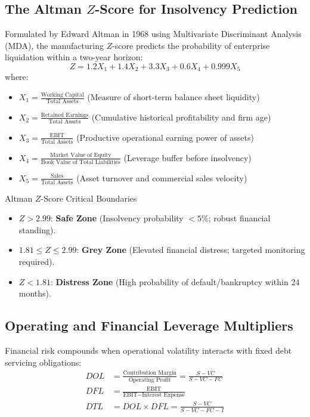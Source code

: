 \subsection{The Altman $Z$-Score for Insolvency Prediction}
Formulated by Edward Altman in 1968 using Multivariate Discriminant Analysis (MDA), the manufacturing $Z$-score predicts the probability of enterprise liquidation within a two-year horizon:
\begin{equation}
Z = 1.2 X_1 + 1.4 X_2 + 3.3 X_3 + 0.6 X_4 + 0.999 X_5
\label{eq:altman_z}
\end{equation}
where:
\begin{itemize}
    \item $X_1 = \frac{\text{Working Capital}}{\text{Total Assets}}$ (Measure of short-term balance sheet liquidity)
    \item $X_2 = \frac{\text{Retained Earnings}}{\text{Total Assets}}$ (Cumulative historical profitability and firm age)
    \item $X_3 = \frac{\text{EBIT}}{\text{Total Assets}}$ (Productive operational earning power of assets)
    \item $X_4 = \frac{\text{Market Value of Equity}}{\text{Book Value of Total Liabilities}}$ (Leverage buffer before insolvency)
    \item $X_5 = \frac{\text{Sales}}{\text{Total Assets}}$ (Asset turnover and commercial sales velocity)
\end{itemize}

\begin{theorembox}{Altman $Z$-Score Critical Boundaries}
\begin{itemize}
    \item $Z > 2.99$: \textbf{Safe Zone} (Insolvency probability $< 5\%$; robust financial standing).
    \item $1.81 \le Z \le 2.99$: \textbf{Grey Zone} (Elevated financial distress; targeted monitoring required).
    \item $Z < 1.81$: \textbf{Distress Zone} (High probability of default/bankruptcy within 24 months).
\end{itemize}
\end{theorembox}

\subsection{Operating and Financial Leverage Multipliers}
Financial risk compounds when operational volatility interacts with fixed debt servicing obligations:
\begin{align}
DOL &= \frac{\text{Contribution Margin}}{\text{Operating Profit}} = \frac{S - VC}{S - VC - FC} \label{eq:dol} \\
DFL &= \frac{\text{EBIT}}{\text{EBIT} - \text{Interest Expense}} \label{eq:dfl} \\
DTL &= DOL \times DFL = \frac{S - VC}{S - VC - FC - I} \label{eq:dtl}
\end{align}

